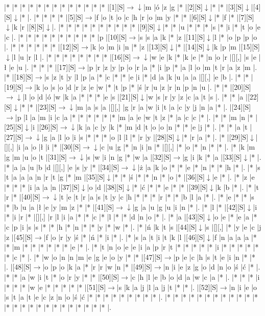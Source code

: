 \documentclass[11pt]{article}
\newcommand\drarr{$\rightarrow \!\!\!\!\! \downarrow$}
\newcommand\rarr{$\rightarrow$}
\newcommand\darr{$\downarrow$}
\begin{document}
\noindent\begin{Puzzle}{24}{31}|*	|*	|*	|*	|*	|*	|*	|*	|*	|*	|*	|*	|*	|[1][S]\drarr	|m	|ó	|z	|g	|*	|[2][S]\darr	|*	|*	|[3][S]\darr	|[4][S]\darr	|*	|.
|*	|*	|*	|*	|[5][S]\rarr	|f	|o	|t	|o	|c	|h	|r	|o	|m	|y	|*	|*	|[6][S]\darr	|*	|f	|*	|[7][S]\darr	|k	|r	|[8][S]\darr	|.
|*	|*	|*	|*	|*	|*	|*	|*	|*	|*	|[9][S]\darr	|*	|*	|u	|*	|*	|*	|s	|*	|i	|*	|t	|o	|e	|c	|.
|*	|*	|*	|*	|*	|*	|*	|*	|*	|*	|p	|[10][S]\rarr	|s	|s	|a	|k	|*	|z	|[11][S]\darr	|l	|*	|o	|p	|p	|o	|.
|*	|*	|*	|*	|*	|*	|[12][S]\rarr	|k	|o	|m	|i	|n	|*	|z	|[13][S]\darr	|*	|[14][S]\darr	|k	|p	|m	|[15][S]\darr	|l	|u	|r	|l	|.
|*	|*	|*	|*	|*	|*	|*	|*	|[16][S]\drarr	|w	|e	|k	|*	|k	|e	|*	|n	|o	|r	|[][,]{ }	|s	|e	|ł	|e	|u	|.
|*	|*	|*	|[17][S]\rarr	|p	|r	|z	|y	|p	|o	|r	|a	|*	|i	|p	|*	|a	|l	|o	|m	|t	|r	|a	|z	|m	|.
|*	|[18][S]\rarr	|s	|z	|t	|y	|l	|p	|a	|*	|c	|*	|*	|e	|i	|*	|d	|a	|k	|u	|a	|a	|[][,]{ }	|e	|b	|.
|*	|*	|[19][S]\rarr	|k	|o	|s	|o	|d	|r	|z	|e	|w	|*	|t	|p	|*	|ś	|r	|u	|z	|r	|n	|p	|n	|u	|.
|*	|*	|[20][S]\drarr	|l	|o	|d	|ó	|w	|k	|a	|*	|*	|*	|e	|s	|[21][S]\darr	|w	|s	|r	|y	|z	|c	|a	|t	|s	|.
|*	|*	|a	|[22][S]\darr	|*	|*	|[23][S]\drarr	|m	|a	|s	|a	|[][,]{ }	|g	|r	|a	|w	|i	|t	|a	|c	|y	|j	|n	|a	|*	|.
|[24][S]\rarr	|p	|l	|a	|m	|i	|c	|a	|*	|*	|*	|*	|*	|*	|m	|a	|e	|w	|t	|z	|*	|a	|c	|c	|*	|.
|*	|*	|m	|n	|*	|[25][S]\darr	|i	|[26][S]\drarr	|k	|a	|c	|y	|k	|*	|m	|d	|t	|o	|o	|n	|*	|*	|e	|j	|*	|.
|*	|*	|a	|t	|[27][S]\drarr	|g	|a	|l	|o	|i	|s	|*	|*	|*	|o	|l	|l	|*	|r	|y	|[28][S]\darr	|*	|r	|a	|*	|.
|*	|[29][S]\darr	|[][,]{ }	|i	|a	|o	|ł	|i	|*	|[30][S]\drarr	|c	|u	|g	|*	|n	|i	|n	|*	|[][,]{ }	|*	|o	|*	|n	|*	|*	|.
|*	|k	|m	|g	|m	|u	|o	|t	|[31][S]\drarr	|s	|w	|i	|n	|g	|*	|w	|a	|[32][S]\rarr	|g	|i	|k	|*	|a	|[33][S]\darr	|*	|.
|*	|a	|a	|u	|b	|d	|[][,]{ }	|e	|s	|y	|*	|[34][S]\drarr	|ż	|a	|k	|o	|*	|*	|e	|*	|n	|*	|*	|h	|*	|.
|*	|s	|t	|a	|a	|a	|n	|r	|t	|g	|*	|m	|[35][S]\darr	|*	|*	|ś	|*	|*	|n	|*	|o	|*	|[36][S]\darr	|e	|*	|.
|*	|z	|e	|*	|*	|*	|i	|a	|a	|n	|[37][S]\darr	|o	|d	|[38][S]\darr	|*	|ć	|*	|*	|e	|*	|*	|[39][S]\darr	|k	|b	|*	|.
|*	|t	|r	|*	|[40][S]\drarr	|t	|e	|t	|r	|a	|s	|t	|y	|c	|h	|*	|*	|*	|r	|*	|*	|b	|l	|a	|*	|.
|*	|e	|*	|*	|s	|*	|b	|u	|a	|ł	|e	|y	|m	|z	|*	|*	|[41][S]\drarr	|g	|a	|u	|g	|u	|i	|n	|*	|.
|*	|l	|*	|[42][S]\darr	|i	|*	|i	|r	|*	|[][,]{ }	|r	|l	|i	|a	|*	|*	|c	|*	|l	|*	|*	|d	|n	|o	|*	|.
|*	|a	|[43][S]\darr	|o	|e	|*	|e	|a	|*	|c	|p	|i	|s	|s	|*	|*	|h	|*	|n	|*	|*	|y	|*	|w	|*	|.
|*	|ń	|k	|t	|s	|[44][S]\darr	|s	|[][,]{ }	|*	|y	|e	|c	|j	|z	|[45][S]\rarr	|f	|o	|r	|y	|ś	|*	|ń	|*	|i	|*	|.
|*	|s	|a	|t	|i	|t	|k	|l	|[46][S]\darr	|f	|n	|a	|a	|a	|*	|*	|m	|*	|*	|*	|*	|*	|*	|e	|*	|.
|*	|t	|n	|o	|e	|e	|i	|a	|p	|r	|t	|*	|*	|*	|*	|*	|i	|*	|*	|*	|*	|*	|*	|c	|*	|.
|*	|w	|o	|n	|n	|m	|e	|g	|e	|o	|y	|*	|*	|[47][S]\rarr	|p	|e	|c	|h	|s	|t	|e	|i	|n	|*	|*	|.
|[48][S]\rarr	|o	|p	|o	|k	|a	|*	|r	|r	|w	|n	|*	|[49][S]\rarr	|n	|i	|e	|z	|g	|o	|d	|n	|o	|ś	|ć	|*	|.
|*	|*	|a	|w	|i	|t	|*	|o	|r	|y	|*	|*	|[50][S]\rarr	|c	|h	|l	|e	|b	|o	|d	|a	|w	|c	|a	|*	|.
|*	|*	|*	|i	|*	|*	|*	|w	|e	|*	|*	|*	|*	|*	|[51][S]\rarr	|s	|k	|a	|j	|l	|a	|j	|t	|*	|*	|.
|[52][S]\rarr	|n	|i	|e	|o	|s	|t	|a	|t	|e	|c	|z	|n	|o	|ś	|ć	|*	|*	|*	|*	|*	|*	|*	|*	|*	|.
|*	|*	|*	|*	|*	|*	|*	|*	|*	|*	|*	|*	|*	|*	|*	|*	|*	|*	|*	|*	|*	|*	|*	|*	|*	|.\end{Puzzle}
\end{document}
